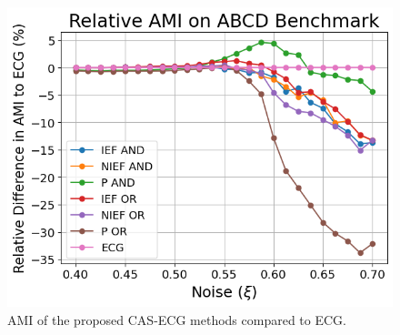 \documentclass{beamer}
\begin{document}
\begin{frame}{}
    \begin{figure}
        \includegraphics[height=0.8\textheight]{figures/relative-ami-cas-ecg.png}
        \caption{AMI of the proposed CAS-ECG methods compared to ECG.}
    \end{figure}
\end{frame}

\subtitle{Detecting Outliers}
\end{document}
